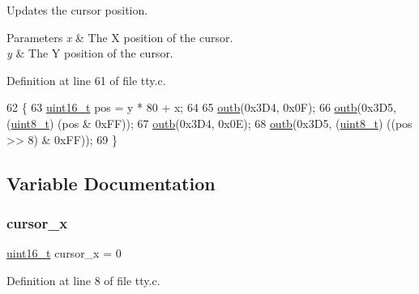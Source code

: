 Updates the cursor position. 


\begin{DoxyParams}{Parameters}
{\em x} & The X position of the cursor. \\
\hline
{\em y} & The Y position of the cursor. \\
\hline
\end{DoxyParams}


Definition at line 61 of file tty.\+c.


\begin{DoxyCode}
62 \{
63     \hyperlink{a00134_a273cf69d639a59973b6019625df33e30_a273cf69d639a59973b6019625df33e30}{uint16\_t} pos = y * 80 + x;
64  
65     \hyperlink{a00158_aa37f5841c54156a4b14fc0d6f626b44f_aa37f5841c54156a4b14fc0d6f626b44f}{outb}(0x3D4, 0x0F);
66     \hyperlink{a00158_aa37f5841c54156a4b14fc0d6f626b44f_aa37f5841c54156a4b14fc0d6f626b44f}{outb}(0x3D5, (\hyperlink{a00134_aba7bc1797add20fe3efdf37ced1182c5_aba7bc1797add20fe3efdf37ced1182c5}{uint8\_t}) (pos & 0xFF));
67     \hyperlink{a00158_aa37f5841c54156a4b14fc0d6f626b44f_aa37f5841c54156a4b14fc0d6f626b44f}{outb}(0x3D4, 0x0E);
68     \hyperlink{a00158_aa37f5841c54156a4b14fc0d6f626b44f_aa37f5841c54156a4b14fc0d6f626b44f}{outb}(0x3D5, (\hyperlink{a00134_aba7bc1797add20fe3efdf37ced1182c5_aba7bc1797add20fe3efdf37ced1182c5}{uint8\_t}) ((pos >> 8) & 0xFF));
69 \}
\end{DoxyCode}


\subsection{Variable Documentation}
\mbox{\label{a00173_ae69604af0f9bd5fca2a016d0aa1ba7e1_ae69604af0f9bd5fca2a016d0aa1ba7e1}} 
\subsubsection{\texorpdfstring{cursor\+\_\+x}{cursor\_x}}
{\footnotesize\ttfamily \hyperlink{a00134_a273cf69d639a59973b6019625df33e30_a273cf69d639a59973b6019625df33e30}{uint16\+\_\+t} cursor\+\_\+x = 0}



Definition at line 8 of file tty.\+c.

\mbox{\label{a00173_a0301c5492919c401c2c1ecf52af709b0_a0301c5492919c401c2c1ecf52af709b0}} 
